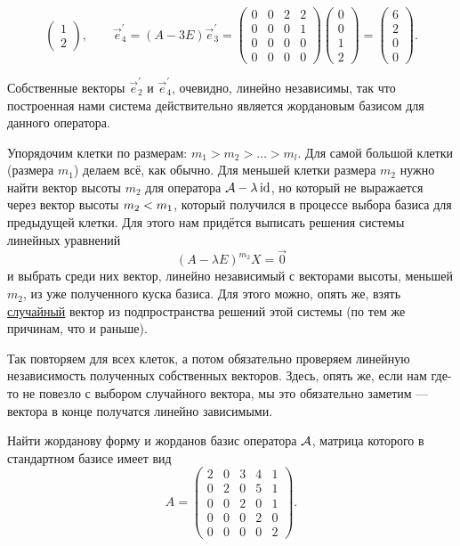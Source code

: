 \begin{solution}
\[\begin{pmatrix}
			1\\
			2
		\end{pmatrix},\qquad
		\vec{e}^\prime_4 = (A - 3E)\vec{e}^\prime_3 =
		\begin{pmatrix}
			0 & 0 & 2 & 2\\
			0 & 0 & 0 & 1\\
			0 & 0 & 0 & 0\\
			0 & 0 & 0 & 0
		\end{pmatrix}
		\begin{pmatrix}
			0\\
			0\\
			1\\
			2
		\end{pmatrix} =
		\begin{pmatrix}
			6\\
			2\\
			0\\
			0
		\end{pmatrix}.
	\]

	Собственные векторы $\vec{e}^\prime_2$ и $\vec{e}^\prime_4$, очевидно, линейно независимы, так что построенная нами система действительно является жордановым базисом для данного оператора.
\end{solution}

\medskip
{}
\smallskip

Упорядочим клетки по размерам: $m_1 > m_2 > \ldots > m_l$. Для самой большой клетки (размера $m_1$) делаем всё, как обычно. Для меньшей клетки размера $m_2$ нужно найти вектор высоты $m_2$ для оператора $\mathcal{A} - \lambda\operatorname{id}$, но который не выражается через вектор высоты $m_2 \hm< m_1$, который получился в процессе выбора базиса для предыдущей клетки. Для этого нам придётся выписать решения системы линейных уравнений
\[
	(A - \lambda E)^{m_2}X = \vec{0}
\]
и выбрать среди них вектор, линейно независимый с векторами высоты, меньшей $m_2$, из уже полученного куска базиса. Для этого можно, опять же, взять \underline{случайный} вектор из подпространства решений этой системы (по тем же причинам, что и раньше).

Так повторяем для всех клеток, а потом обязательно проверяем линейную независимость полученных собственных векторов. Здесь, опять же, если нам где-то не повезло с выбором случайного вектора, мы это обязательно заметим --- вектора в конце получатся линейно зависимыми.

\begin{problem}
	Найти жорданову форму и жорданов базис оператора $\mathcal{A}$, матрица которого в стандартном базисе имеет вид
	\[
		A =
		\begin{pmatrix}
			2 & 0 & 3 & 4 & 1\\
			0 & 2 & 0 & 5 & 1\\
			0 & 0 & 2 & 0 & 1\\
			0 & 0 & 0 & 2 & 0\\
			0 & 0 & 0 & 0 & 2
		\end{pmatrix}.
	\]
\end{problem}

